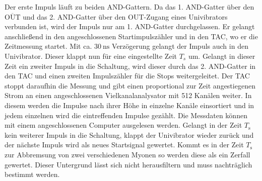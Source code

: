     Der erste Impuls läuft zu beiden AND-Gattern. Da das 1. AND-Gatter über den $\overline{\text{OUT}}$  und das 2. AND-Gatter über den OUT-Zugang eines Univibrators verbunden ist, wird der Impuls nur am 1. AND-Gatter durchgelassen. Er gelangt anschließend in den angeschlossenen Startimpulszähler und in den TAC, wo er die Zeitmessung startet. Mit ca. $\SI{30}{\nano\second}$ Verzögerung gelangt der Impuls auch in den Univibrator. Dieser klappt nun für eine eingestellte Zeit $T_s$ um. Gelangt in dieser Zeit ein zweiter Impuls in die Schaltung, wird dieser durch das 2. AND-Gatter in den TAC und einen zweiten Impulszähler für die Stops weitergeleitet. Der TAC stoppt daraufhin die Messung und gibt einen proportional zur Zeit angestiegenen Strom an einen angeschlossenen Vielkanalanalysator mit 512 Kanälen weiter. In diesem werden die Impulse nach ihrer Höhe in einzelne Kanäle einsortiert und in jedem einzelnen wird die eintreffenden Impulse gezählt. Die Messdaten können mit einem angeschlossenen Computer ausgelesen werden. Gelangt in der Zeit $T_\text{s}$ kein weiterer Impuls in die Schaltung, klappt der Univibrator wieder zurück und der nächste Impuls wird als neues Startsignal gewertet. Kommt es in der Zeit $T_\text{s}$ zur Abbremsung von zwei verschiedenen Myonen so werden diese als ein Zerfall gewertet. Dieser Untergrund lässt sich nicht herausfiltern und muss nachträglich bestimmt werden.